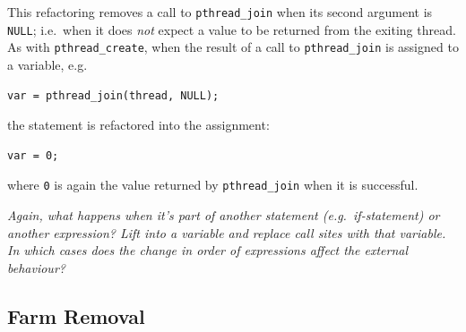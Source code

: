 This refactoring removes a call to \lstinline|pthread_join| when its second argument is \lstinline|NULL|; i.e.\ when it does \emph{not} expect a value to be returned from the exiting thread. As with \lstinline|pthread_create|, when the result of a call to \lstinline|pthread_join| is assigned to a variable, e.g.\

\begin{lstlisting}[frame=single]
var = pthread_join(thread, NULL);
\end{lstlisting}

\noindent
the statement is refactored into the assignment:

\begin{lstlisting}[frame=single]
var = 0;
\end{lstlisting}

\noindent
where \lstinline|0| is again the value returned by \lstinline|pthread_join| when it is successful. 

\emph{Again, what happens when it's part of another statement (e.g.\ if-statement) or another expression? Lift into a variable and replace call sites with that variable. In which cases does the change in order of expressions affect the external behaviour?}

\subsection{Farm Removal}

